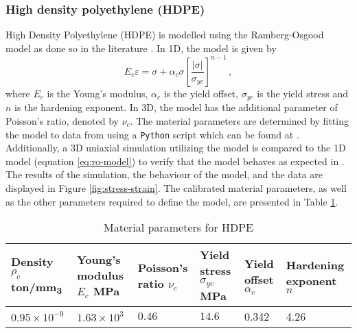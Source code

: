 \documentclass{article}
\begin{document}
\subsubsection{High density polyethylene (HDPE)}
High Density Polyethylene (HDPE) is modelled using the Ramberg-Osgood model as done so in the literature \cite{amjadi2020tensile}. In 1D, the model is given by
\begin{equation}
	E_{c}\varepsilon = \sigma + \alpha_{c} \sigma\left[\dfrac{|\sigma|}{\sigma_{yc}}\right]^{n-1}\,,
	\label{eq:ro-model}
\end{equation} 
where $E_{c}$ is the Young's modulus, $\alpha_{c}$ is the yield offset, $\sigma_{yc}$ is the yield stress and $n$ is the hardening exponent. In 3D, the model has the additional parameter of Poisson's ratio, denoted by $\nu_{c}$. The material parameters are determined by fitting the model to data from \cite{amjadi2020tensile} using a \texttt{Python} script which can be found at . Additionally, a 3D uniaxial \abaqus simulation utilizing the model is compared to the 1D model (equation \eqref{eq:ro-model}) to verify that the model behaves as expected in \abaqus. The results of the simulation, the behaviour of the model, and the data are displayed in Figure \ref{fig:stress-strain}.
The calibrated material parameters, as well as the other parameters required to define the model, are presented in Table \ref{tab:hdpe-mat-params}.
\begin{table}[!htb]
	\newcommand{\colsize}{2.cm}
	\centering
	\caption{Material parameters for HDPE}
	\label{tab:hdpe-mat-params}
	\begin{tabular}{p{\colsize}| p{\colsize} | p{\colsize} | p{\colsize} | p{\colsize} | p{\colsize}}
		Density $\rho_{c}$ ton/mm\textsubscript{3} \cite{dasari2003microstructural, amjadi2020tensile} & Young's modulus $E_{c}$ MPa & Poisson's ratio $\nu_{c}$ \cite{nitta2012poisson} &  Yield stress $\sigma_{yc}$ MPa & Yield offset $\alpha_{c}$ & Hardening exponent $n$\\
		\hline\hline
		$0.95\times 10^{-9}$ & $1.63\times 10^{3}$ & $0.46$ & $14.6$ & 0.342 & 4.26
	\end{tabular}
\end{table}
\end{document}
